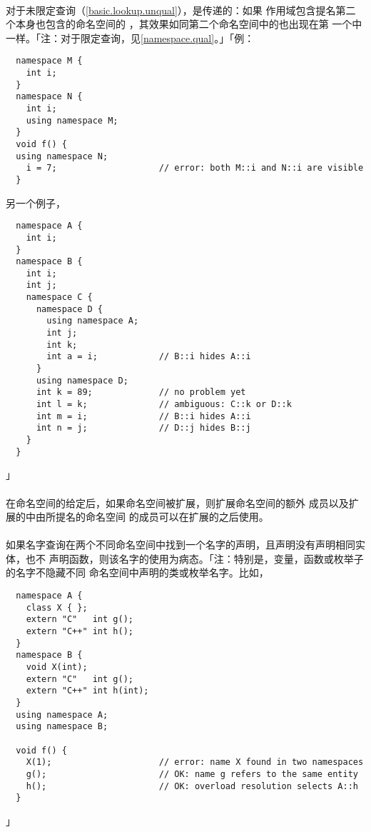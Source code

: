\paragraph{}
对于未限定查询（\ref{basic.lookup.unqual}），是传递的：如果
作用域包含提名第二个本身也包含的命名空间的
，其效果如同第二个命名空间中的也出现在第
一个中一样。「注：对于限定查询，见\ref{namespace.qual}。」「例：
\begin{lstlisting}
  namespace M {
    int i;
  }
  namespace N {
    int i;
    using namespace M;
  }
  void f() {
  using namespace N;
    i = 7;                    // error: both M::i and N::i are visible
  }
\end{lstlisting}
另一个例子，
\begin{lstlisting}
  namespace A {
    int i;
  }
  namespace B {
    int i;
    int j;
    namespace C {
      namespace D {
        using namespace A;
        int j;
        int k;
        int a = i;            // B::i hides A::i
      }
      using namespace D;
      int k = 89;             // no problem yet
      int l = k;              // ambiguous: C::k or D::k
      int m = i;              // B::i hides A::i
      int n = j;              // D::j hides B::j
    }
  }
\end{lstlisting}」

\paragraph{}
在命名空间的给定后，如果命名空间被扩展，则扩展命名空间的额外
成员以及扩展的中由所提名的命名空间
的成员可以在扩展的之后使用。

\paragraph{}
如果名字查询在两个不同命名空间中找到一个名字的声明，且声明没有声明相同实体，也不
声明函数，则该名字的使用为病态。「注：特别是，变量，函数或枚举子的名字不隐藏不同
命名空间中声明的类或枚举名字。比如，
\begin{lstlisting}
  namespace A {
    class X { };
    extern "C"   int g();
    extern "C++" int h();
  }
  namespace B {
    void X(int);
    extern "C"   int g();
    extern "C++" int h(int);
  }
  using namespace A;
  using namespace B;

  void f() {
    X(1);                     // error: name X found in two namespaces
    g();                      // OK: name g refers to the same entity
    h();                      // OK: overload resolution selects A::h
  }
\end{lstlisting}」

